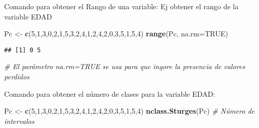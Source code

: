\documentclass[
]{book}
\newenvironment{Shaded}{\begin{snugshade}}{\end{snugshade}}
\newcommand{\CommentTok}[1]{\textcolor[rgb]{0.56,0.35,0.01}{\textit{#1}}}
\newcommand{\DataTypeTok}[1]{\textcolor[rgb]{0.13,0.29,0.53}{#1}}
\newcommand{\DecValTok}[1]{\textcolor[rgb]{0.00,0.00,0.81}{#1}}
\newcommand{\KeywordTok}[1]{\textcolor[rgb]{0.13,0.29,0.53}{\textbf{#1}}}
\newcommand{\NormalTok}[1]{#1}
\newcommand{\OtherTok}[1]{\textcolor[rgb]{0.56,0.35,0.01}{#1}}
\newcommand{\StringTok}[1]{\textcolor[rgb]{0.31,0.60,0.02}{#1}}
\theoremstyle{definition}
\theoremstyle{definition}
\theoremstyle{definition}
\theoremstyle{definition}
\theoremstyle{remark}
\begin{document}
Comando para obtener el Rango de una variable: Ej obtener el rango de la variable EDAD

\begin{Shaded}
\begin{Highlighting}[]
\NormalTok{Pc <-}\StringTok{ }\KeywordTok{c}\NormalTok{(}\DecValTok{5}\NormalTok{,}\DecValTok{1}\NormalTok{,}\DecValTok{3}\NormalTok{,}\DecValTok{0}\NormalTok{,}\DecValTok{2}\NormalTok{,}\DecValTok{1}\NormalTok{,}\DecValTok{5}\NormalTok{,}\DecValTok{3}\NormalTok{,}\DecValTok{2}\NormalTok{,}\DecValTok{4}\NormalTok{,}\DecValTok{1}\NormalTok{,}\DecValTok{2}\NormalTok{,}\DecValTok{4}\NormalTok{,}\DecValTok{2}\NormalTok{,}\DecValTok{0}\NormalTok{,}\DecValTok{3}\NormalTok{,}\DecValTok{5}\NormalTok{,}\DecValTok{1}\NormalTok{,}\DecValTok{5}\NormalTok{,}\DecValTok{4}\NormalTok{)}
\KeywordTok{range}\NormalTok{(Pc, }\DataTypeTok{na.rm=}\OtherTok{TRUE}\NormalTok{)}
\end{Highlighting}
\end{Shaded}

\begin{verbatim}
## [1] 0 5
\end{verbatim}

\begin{Shaded}
\begin{Highlighting}[]
\CommentTok{# El parámetro na.rm=TRUE se usa para que ingore la presencia de valores perdidos}
\end{Highlighting}
\end{Shaded}

Comando para obtener el número de clases para la variable EDAD:

\begin{Shaded}
\begin{Highlighting}[]
\NormalTok{Pc <-}\StringTok{ }\KeywordTok{c}\NormalTok{(}\DecValTok{5}\NormalTok{,}\DecValTok{1}\NormalTok{,}\DecValTok{3}\NormalTok{,}\DecValTok{0}\NormalTok{,}\DecValTok{2}\NormalTok{,}\DecValTok{1}\NormalTok{,}\DecValTok{5}\NormalTok{,}\DecValTok{3}\NormalTok{,}\DecValTok{2}\NormalTok{,}\DecValTok{4}\NormalTok{,}\DecValTok{1}\NormalTok{,}\DecValTok{2}\NormalTok{,}\DecValTok{4}\NormalTok{,}\DecValTok{2}\NormalTok{,}\DecValTok{0}\NormalTok{,}\DecValTok{3}\NormalTok{,}\DecValTok{5}\NormalTok{,}\DecValTok{1}\NormalTok{,}\DecValTok{5}\NormalTok{,}\DecValTok{4}\NormalTok{)}
\KeywordTok{nclass.Sturges}\NormalTok{(Pc)  }\CommentTok{# Número de intervalos}
\end{Highlighting}
\end{Shaded}
\end{document}

